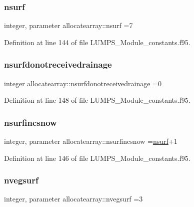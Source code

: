 \subsubsection{\texorpdfstring{nsurf}{nsurf}}
{\footnotesize\ttfamily integer, parameter allocatearray\+::nsurf =7}



Definition at line 144 of file L\+U\+M\+P\+S\+\_\+\+Module\+\_\+constants.\+f95.

\mbox{\label{namespaceallocatearray_af43f469ef09aa8c607146cf31d4c6eaf}} 
\subsubsection{\texorpdfstring{nsurfdonotreceivedrainage}{nsurfdonotreceivedrainage}}
{\footnotesize\ttfamily integer allocatearray\+::nsurfdonotreceivedrainage =0}



Definition at line 148 of file L\+U\+M\+P\+S\+\_\+\+Module\+\_\+constants.\+f95.

\mbox{\label{namespaceallocatearray_af4d113f332b6759cfa22271140c9162d}} 
\subsubsection{\texorpdfstring{nsurfincsnow}{nsurfincsnow}}
{\footnotesize\ttfamily integer, parameter allocatearray\+::nsurfincsnow =\hyperlink{namespaceallocatearray_acd22f92a06f7e9a2a91426b3dc99fdb0}{nsurf}+1}



Definition at line 146 of file L\+U\+M\+P\+S\+\_\+\+Module\+\_\+constants.\+f95.

\mbox{\label{namespaceallocatearray_abb987c3b35dd321963fd53d38f10236f}} 
\subsubsection{\texorpdfstring{nvegsurf}{nvegsurf}}
{\footnotesize\ttfamily integer, parameter allocatearray\+::nvegsurf =3}



